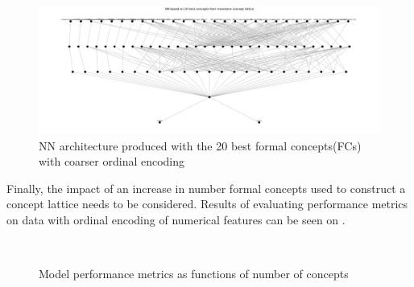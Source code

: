 \documentclass[14pt,a4paper]{extarticle}
\begin{document}
	\begin{figure}[h]
		\centering
		\includegraphics[width=\textwidth]{media/employees/NN_architecture_20concepts.png}
		\caption{NN architecture produced with the 20 best formal concepts(FCs) with coarser ordinal encoding}
		\label{fig:20concepts-coarse}
	\end{figure}
	
	Finally, the impact of an increase in number formal concepts used to construct a concept lattice needs to be considered. Results of evaluating performance metrics on data with ordinal encoding of numerical features can be seen on .  
	
	\begin{figure}[h]
		\centering
		\\ 
		\caption{Model performance metrics as functions of number of concepts}
		\label{fig:metrix}
	\end{figure}
	
	\newpage
	
\end{document}
